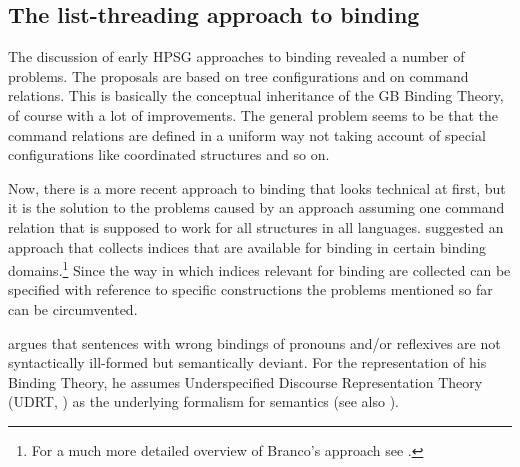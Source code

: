\documentclass[output=paper
 	        ,biblatex
                ,babelshorthands
                ,newtxmath
                ,draftmode
                ,colorlinks, citecolor=brown
]{langscibook}
\begin{document}
\subsection{The list-threading approach to binding}


The discussion of early HPSG approaches to binding revealed a number of problems. The proposals are
based on tree configurations and on command relations. This is basically the conceptual inheritance
of the GB Binding Theory, of course with a lot of improvements. The general problem seems to be that
the command relations are defined in a uniform way not taking account of special configurations like
coordinated structures and so on.

Now, there is a more recent approach to binding that looks technical at first, but it is the
solution to the problems caused by an approach assuming one command relation that is supposed
to work for all structures in all languages. \citet{Branco2002a} suggested an approach that collects
indices that are available for binding in certain binding domains.\footnote{%
For a much more detailed overview of Branco's approach see .
} Since the way in which indices
relevant for binding are collected can be specified with reference to specific constructions the
problems mentioned so far can be circumvented. 

\citet{Branco2002a} argues that sentences with wrong bindings of pronouns and/or reflexives are not
syntactically ill-formed but semantically deviant. For the representation of his Binding Theory, he
assumes Underspecified Discourse Representation Theory (UDRT, \citealp{Reyle93b-u,FR95a-u}) as the
underlying formalism for semantics (see also
). 
\end{document}

